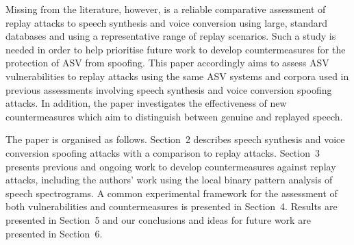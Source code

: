 
Missing from the literature, however, is a reliable comparative assessment 
of replay attacks to speech synthesis and voice conversion using large, 
standard databases and using a representative range of replay scenarios. 
Such a study is needed in order to help prioritise future work to develop
countermeasures for the protection of ASV from spoofing.
This paper accordingly aims to assess ASV vulnerabilities 
to replay attacks using the same ASV systems and corpora used in 
previous assessments involving speech synthesis and voice conversion  
spoofing attacks.  In addition, the paper investigates the effectiveness of 
new countermeasures which aim to distinguish between genuine and replayed speech.  

The paper is organised as follows.  Section~2 describes speech synthesis and voice conversion spoofing attacks with a comparison to replay attacks. Section~3 presents previous and ongoing work to develop countermeasures against replay attacks, including the authors' work using the local binary pattern analysis of speech spectrograms.  A common experimental framework for the assessment of both vulnerabilities and countermeasures is presented in Section~4. Results are presented in Section~5 and our conclusions and ideas for future work are presented in Section~6.
